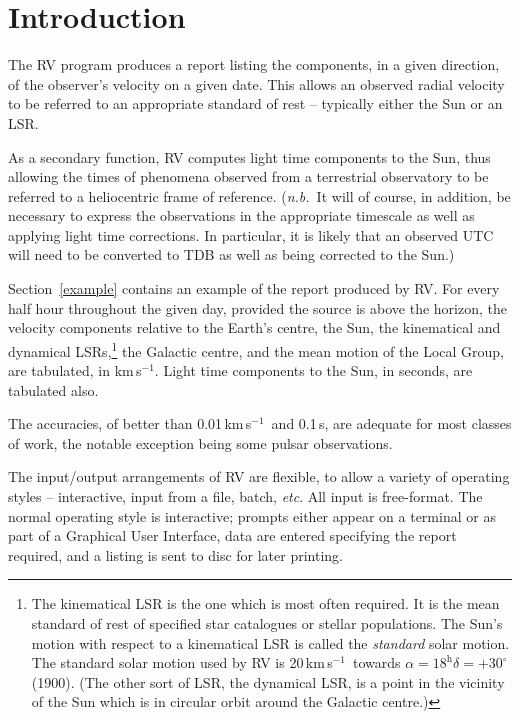 \documentclass[11pt,noabs,nolof]{starlink}
\providecommand{\kms}{{km\,s$^{-1}$}}
\begin{document}
\scfrontmatter

\section{Introduction}

The RV program produces a report listing the components, in a given
direction, of the observer's velocity on a given date.  This allows an
observed radial velocity to be referred to an appropriate standard of
rest -- typically either the Sun or an LSR.

As a secondary function, RV computes light time components to the Sun,
thus allowing the times of phenomena observed from a terrestrial
observatory to be referred to a heliocentric frame of reference.
(\textit{n.b.}\ It will of course, in addition, be necessary to express the
observations in the appropriate timescale as well as applying light
time corrections.  In particular, it is likely that an observed UTC
will need to be converted to TDB as well as being corrected to the
Sun.)

Section~\ref{example} contains an example of the report produced by RV.
For every half hour throughout the given day, provided the source is above the
horizon, the velocity components relative to the Earth's centre, the Sun, the
kinematical and dynamical LSRs,\footnote{The kinematical LSR is the
one which is most often required.  It is the mean standard of
rest of specified star catalogues or
stellar populations.  The Sun's motion with respect to a
kinematical LSR is called the \textit{standard}\/ solar motion.
The standard solar motion used by RV is
20\,\kms\ towards $\alpha=18^{\mathrm{h}} \delta=+30^{\circ}$
(1900). (The other sort of LSR, the dynamical LSR, is a point in the
vicinity of the Sun which is in circular orbit around the
Galactic centre.)}
the Galactic centre, and the mean motion of the Local
Group, are tabulated, in \kms.
Light time components to the Sun, in seconds, are tabulated also.

The accuracies, of better than 0.01\,\kms\ and 0.1\,s, are
adequate for most classes of work, the notable exception
being some pulsar observations.

The input/output arrangements of RV are flexible, to allow a variety of
operating styles -- interactive, input from a file, batch, \textit{etc}.
All input is free-format. The normal operating style is interactive;
prompts either appear on a terminal or as part of a Graphical User
Interface, data are entered specifying the report required, and a
listing is sent to disc for later printing.
\end{document}
